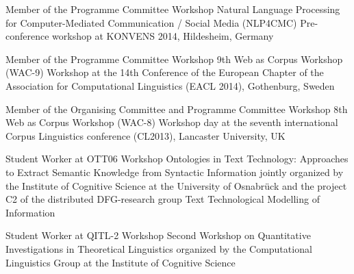 
        {Member of the Programme Committee}
        {Workshop}
        {Natural Language Processing for Computer-Mediated Communication /
        Social Media (NLP4CMC)}
        {Pre-conference workshop at KONVENS 2014, Hildesheim, Germany}
        {}

        {Member of the Programme Committee}
        {Workshop}
        {9th Web as Corpus Workshop (WAC-9)}
        {Workshop at the 14th Conference of the European Chapter of the
        Association for Computational Linguistics (EACL 2014), Gothenburg,
        Sweden}
        {}

        {Member of the Organising Committee and Programme Committee}
        {Workshop}
        {8th Web as Corpus Workshop (WAC-8)}
        {Workshop day at the seventh international Corpus Linguistics
        conference (CL2013), Lancaster University, UK}
        {}

        {Student Worker at OTT06}
        {Workshop}
        {Ontologies in Text Technology: Approaches to Extract Semantic
        Knowledge from Syntactic Information}
        {jointly organized by the Institute of Cognitive Science at the
        University of Osnabr\"{u}ck and the project C2 of the distributed
        DFG-research group Text Technological Modelling of Information}
        {}

        {Student Worker at QITL-2}
        {Workshop}
        {Second Workshop on Quantitative Investigations in Theoretical
        Linguistics}
        {organized by the Computational Linguistics Group at the Institute of
        Cognitive Science}
        {}


